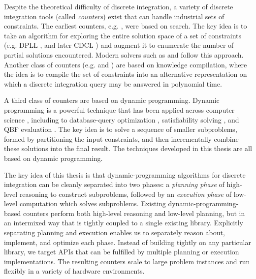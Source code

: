 Despite the theoretical difficulty of discrete integration, a variety of discrete integration tools (called \emph{counters}) exist that can handle industrial sets of constraints. The earliest counters, e.g.  \cite{birnbaum1999good}, were based on search.
The key idea is to take an algorithm for exploring the entire solution space of a set of constraints (e.g. DPLL \cite{davis1960computing,davis1962machine}, and later CDCL \cite{biere2009conflict}) and augment it to enumerate the number of partial solutions encountered. 
Modern solvers such as  \cite{SBK05} and  \cite{Thurley2006} follow this approach.
Another class of counters (e.g.  \cite{OD15} and  \cite{LM17}) are based on knowledge compilation, where the idea is to compile the set of constraints into an alternative representation on which a discrete integration query may be answered in polynomial time.

A third class of counters \cite{CW16,FHMW17,FHWZ18,FHZ19,DPV20,phan2019weighted,fichte2020exploiting} are based on dynamic programming. %
Dynamic programming is a powerful technique that has been applied across computer science \cite{bellman1966dynamic}, including to database-query optimization \cite{MPPV04}, satisfiability solving \cite{uribe1994ordered,aguirre2001random,pan2005symbolic}, and QBF evaluation \cite{charwat2016bdd}.
The key idea is to solve a sequence of smaller subproblems, formed by partitioning the input constraints, and then incrementally combine these solutions into the final result.
The techniques developed in this thesis are all based on dynamic programming.

The key idea of this thesis is that dynamic-programming algorithms for discrete integration can be cleanly separated into two phases: a \emph{planning phase} of high-level reasoning to construct subproblems, followed by an \emph{execution phase} of low-level computation which solves subproblems.
Existing dynamic-programming-based counters perform both high-level reasoning and low-level planning, but in an intermixed way that is tightly coupled to a single existing library.
Explicitly separating planning and execution enables us to separately reason about, implement, and optimize each phase.
Instead of building tightly on any particular library, we target APIs that can be fulfilled by multiple planning or execution implementations.
The resulting counters scale to large problem instances and run flexibly in a variety of hardware environments.

